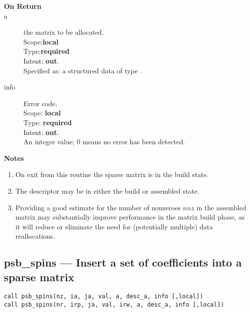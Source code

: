 \begin{description}
\item[\bf On Return]
\item[a] the matrix to be allocated.\\
Scope:{\bf local}\\
Type:{\bf required}\\
Intent: {\bf out}.\\
Specified as: a structured data of type \spdata.
\item[info] Error code.\\
Scope: {\bf local} \\
Type: {\bf required} \\
Intent: {\bf out}.\\
An integer value; 0 means no error has been detected. 
\end{description}
{\par\noindent\large\bfseries Notes}
\begin{enumerate}
\item On exit from this routine the sparse matrix  is in the build
  state.
\item The descriptor may be in either the build or assembled state.
\item Providing a good estimate for the number of nonzeroes $nnz$ in
  the assembled matrix may substantially improve performance in the
  matrix build phase, as it will reduce or eliminate the need for
  (potentially multiple) data reallocations. 
\end{enumerate}



%
%
\clearpage\subsection*{psb\_spins --- Insert a set of coefficients into a sparse
  matrix}

\begin{verbatim}
call psb_spins(nz, ia, ja, val, a, desc_a, info [,local])
call psb_spins(nr, irp, ja, val, irw, a, desc_a, info [,local])
\end{verbatim}

